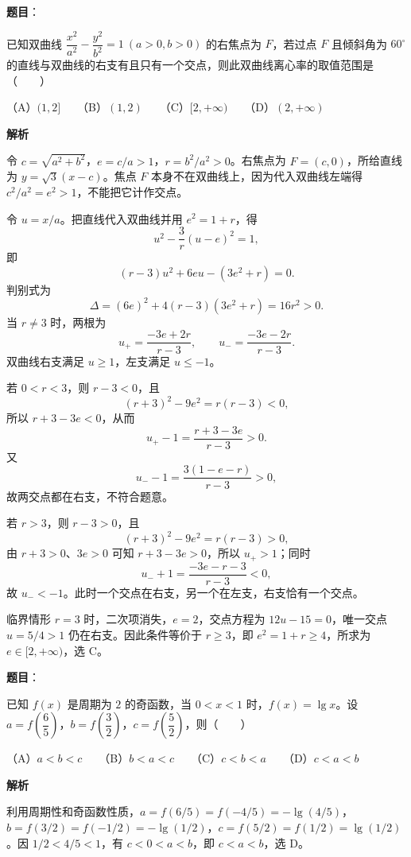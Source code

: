 \begin{answer}

\textbf{题目}：

已知双曲线 $\dfrac{x^2}{a^2}-\dfrac{y^2}{b^2}=1\ (a>0, b>0)$ 的右焦点为 $F$，若过点 $F$ 且倾斜角为 $60^\circ$ 的直线与双曲线的右支有且只有一个交点，则此双曲线离心率的取值范围是\mbox{（　　）}

（A）$(1,2]$　　（B）$(1,2)$　　（C）$[2,+\infty)$　　（D）$(2,+\infty)$

\textbf{解析}

令 $c=\sqrt{a^2+b^2}$，$e=c/a>1$，$r=b^2/a^2>0$。右焦点为 $F=(c,0)$，所给直线为 $y=\sqrt3(x-c)$。焦点 $F$ 本身不在双曲线上，因为代入双曲线左端得 $c^2/a^2=e^2>1$，不能把它计作交点。

令 $u=x/a$。把直线代入双曲线并用 $e^2=1+r$，得
\nopagebreak[4]
\[
u^2-\frac3r(u-e)^2=1,
\]
即
\nopagebreak[4]
\[
(r-3)u^2+6eu-(3e^2+r)=0.
\]
判别式为
\nopagebreak[4]
\[
\Delta=(6e)^2+4(r-3)(3e^2+r)=16r^2>0.
\]
当 $r\ne3$ 时，两根为
\nopagebreak[4]
\[
u_+=\frac{-3e+2r}{r-3},\qquad u_-=\frac{-3e-2r}{r-3}.
\]
双曲线右支满足 $u\ge1$，左支满足 $u\le-1$。

若 $0<r<3$，则 $r-3<0$，且
\nopagebreak[4]
\[
(r+3)^2-9e^2=r(r-3)<0,
\]
所以 $r+3-3e<0$，从而
\nopagebreak[4]
\[
u_+-1=\frac{r+3-3e}{r-3}>0.
\]
又
\nopagebreak[4]
\[
u_--1=\frac{3(1-e-r)}{r-3}>0,
\]
故两交点都在右支，不符合题意。

若 $r>3$，则 $r-3>0$，且
\nopagebreak[4]
\[
(r+3)^2-9e^2=r(r-3)>0,
\]
由 $r+3>0$、$3e>0$ 可知 $r+3-3e>0$，所以 $u_+>1$；同时
\nopagebreak[4]
\[
u_-+1=\frac{-3e-r-3}{r-3}<0,
\]
故 $u_-<-1$。此时一个交点在右支，另一个在左支，右支恰有一个交点。

临界情形 $r=3$ 时，二次项消失，$e=2$，交点方程为 $12u-15=0$，唯一交点 $u=5/4>1$ 仍在右支。因此条件等价于 $r\ge3$，即 $e^2=1+r\ge4$，所求为 $e\in[2,+\infty)$，选 C。

\gkanswer{答案：C，$[2,+\infty)$}

\end{answer}
\begin{answer}

\textbf{题目}：

已知 $f(x)$ 是周期为 $2$ 的奇函数，当 $0<x<1$ 时，$f(x)=\lg x$。设 $a=f\left(\dfrac65\right)$，$b=f\left(\dfrac32\right)$，$c=f\left(\dfrac52\right)$，则\mbox{（　　）}

（A）$a<b<c$　　（B）$b<a<c$　　（C）$c<b<a$　　（D）$c<a<b$

\textbf{解析}

利用周期性和奇函数性质，$a=f(6/5)=f(-4/5)=-\lg(4/5)$，$b=f(3/2)=f(-1/2)=-\lg(1/2)$，$c=f(5/2)=f(1/2)=\lg(1/2)$。因 $1/2<4/5<1$，有 $c<0<a<b$，即 $c<a<b$，选 D。


\end{answer}
